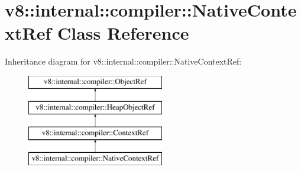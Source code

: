 \hypertarget{classv8_1_1internal_1_1compiler_1_1NativeContextRef}{}\section{v8\+:\+:internal\+:\+:compiler\+:\+:Native\+Context\+Ref Class Reference}
\label{classv8_1_1internal_1_1compiler_1_1NativeContextRef}
Inheritance diagram for v8\+:\+:internal\+:\+:compiler\+:\+:Native\+Context\+Ref\+:\begin{figure}[H]
\begin{center}
\leavevmode
\includegraphics[height=4.000000cm]{classv8_1_1internal_1_1compiler_1_1NativeContextRef}
\end{center}
\end{figure}
